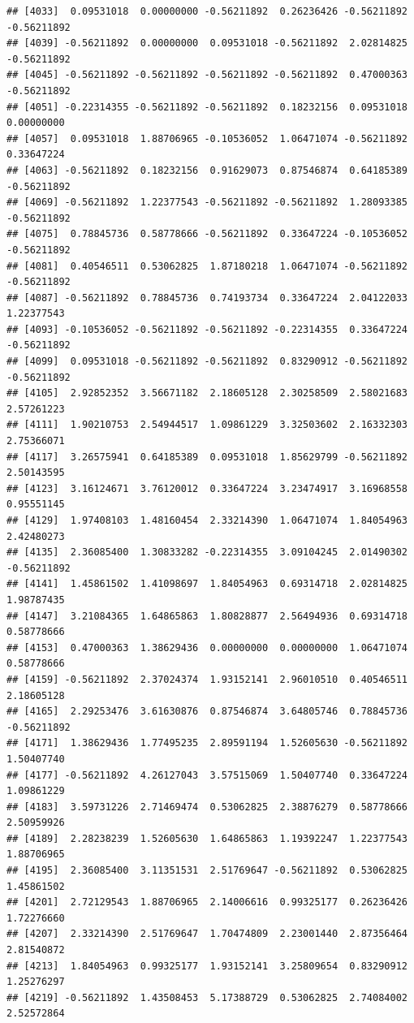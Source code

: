 \documentclass[
]{article}
\begin{document}
\begin{verbatim}
## [4033]  0.09531018  0.00000000 -0.56211892  0.26236426 -0.56211892 -0.56211892
## [4039] -0.56211892  0.00000000  0.09531018 -0.56211892  2.02814825 -0.56211892
## [4045] -0.56211892 -0.56211892 -0.56211892 -0.56211892  0.47000363 -0.56211892
## [4051] -0.22314355 -0.56211892 -0.56211892  0.18232156  0.09531018  0.00000000
## [4057]  0.09531018  1.88706965 -0.10536052  1.06471074 -0.56211892  0.33647224
## [4063] -0.56211892  0.18232156  0.91629073  0.87546874  0.64185389 -0.56211892
## [4069] -0.56211892  1.22377543 -0.56211892 -0.56211892  1.28093385 -0.56211892
## [4075]  0.78845736  0.58778666 -0.56211892  0.33647224 -0.10536052 -0.56211892
## [4081]  0.40546511  0.53062825  1.87180218  1.06471074 -0.56211892 -0.56211892
## [4087] -0.56211892  0.78845736  0.74193734  0.33647224  2.04122033  1.22377543
## [4093] -0.10536052 -0.56211892 -0.56211892 -0.22314355  0.33647224 -0.56211892
## [4099]  0.09531018 -0.56211892 -0.56211892  0.83290912 -0.56211892 -0.56211892
## [4105]  2.92852352  3.56671182  2.18605128  2.30258509  2.58021683  2.57261223
## [4111]  1.90210753  2.54944517  1.09861229  3.32503602  2.16332303  2.75366071
## [4117]  3.26575941  0.64185389  0.09531018  1.85629799 -0.56211892  2.50143595
## [4123]  3.16124671  3.76120012  0.33647224  3.23474917  3.16968558  0.95551145
## [4129]  1.97408103  1.48160454  2.33214390  1.06471074  1.84054963  2.42480273
## [4135]  2.36085400  1.30833282 -0.22314355  3.09104245  2.01490302 -0.56211892
## [4141]  1.45861502  1.41098697  1.84054963  0.69314718  2.02814825  1.98787435
## [4147]  3.21084365  1.64865863  1.80828877  2.56494936  0.69314718  0.58778666
## [4153]  0.47000363  1.38629436  0.00000000  0.00000000  1.06471074  0.58778666
## [4159] -0.56211892  2.37024374  1.93152141  2.96010510  0.40546511  2.18605128
## [4165]  2.29253476  3.61630876  0.87546874  3.64805746  0.78845736 -0.56211892
## [4171]  1.38629436  1.77495235  2.89591194  1.52605630 -0.56211892  1.50407740
## [4177] -0.56211892  4.26127043  3.57515069  1.50407740  0.33647224  1.09861229
## [4183]  3.59731226  2.71469474  0.53062825  2.38876279  0.58778666  2.50959926
## [4189]  2.28238239  1.52605630  1.64865863  1.19392247  1.22377543  1.88706965
## [4195]  2.36085400  3.11351531  2.51769647 -0.56211892  0.53062825  1.45861502
## [4201]  2.72129543  1.88706965  2.14006616  0.99325177  0.26236426  1.72276660
## [4207]  2.33214390  2.51769647  1.70474809  2.23001440  2.87356464  2.81540872
## [4213]  1.84054963  0.99325177  1.93152141  3.25809654  0.83290912  1.25276297
## [4219] -0.56211892  1.43508453  5.17388729  0.53062825  2.74084002  2.52572864

\end{verbatim}
\end{document}
